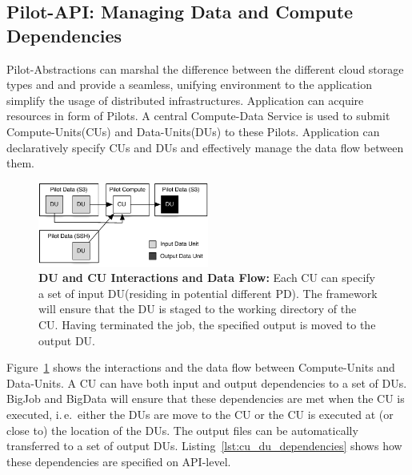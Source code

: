 \documentclass[times]{cpeauth}
\newcommand{\pilot}{Pilot\xspace}
\newcommand{\pilots}{Pilots\xspace}
\newcommand{\computedataservice}{Compute-Data Service\xspace}
\newcommand{\pd}{PD\xspace}
\newcommand{\computeunits}{Compute-Units\xspace}
\newcommand{\dataunits}{Data-Units\xspace}
\newcommand{\du}{DU\xspace}
\newcommand{\dus}{DUs\xspace}
\newcommand{\cu}{CU\xspace}
\newcommand{\cus}{CUs\xspace}
\begin{document}
\subsection{Pilot-API: Managing Data and Compute Dependencies}

\pilot-Abstractions can marshal the difference between the different cloud
storage types and and provide a seamless, unifying environment to the
application simplify the usage of distributed infrastructures. Application can 
acquire resources in form of \pilots. A central \computedataservice is used to 
submit \computeunits (\cus) and \dataunits (\dus) to these \pilots. 
Application  can declaratively specify \cus and \dus and effectively manage 
the data flow between them. 

\begin{figure}
	\centering
		\includegraphics[width=0.5\textwidth]{figures/data-flow.pdf}
	\caption{\textbf{DU and CU Interactions and Data Flow:} Each \cu can specify a set of input \du (residing in potential different \pd). The framework will ensure that the \du is staged to the working directory of the \cu. Having terminated the job, the specified output is moved to the output \du.}
	\label{fig:figures_data-flow}
\end{figure}

Figure~\ref{fig:figures_data-flow} shows the interactions and the data
flow between \computeunits and \dataunits. A \cu can have both input
and output dependencies to a set of \dus. BigJob and BigData will
ensure that these dependencies are met when the \cu is executed,
i.\,e.\ either the \dus are move to the \cu or the \cu is executed at
(or close to) the location of the \dus. The output files can be
automatically transferred to a set of output
\dus. Listing~\ref{lst:cu_du_dependencies} shows how these
dependencies are specified on API-level.
\end{document}
